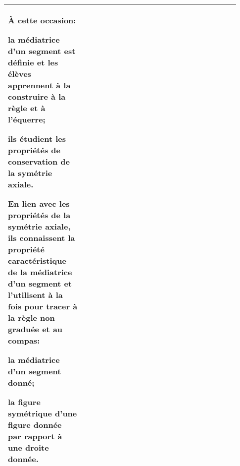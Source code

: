 {\begin{tabular}{|p{0.31\linewidth}|p{0.31\linewidth}|p{0.31\linewidth}|}
À cette occasion:
\begin{mylist}
\item la médiatrice d’un segment est définie et les élèves apprennent à la construire à la règle et à l’équerre;
\item ils étudient les propriétés de conservation de la symétrie axiale.
\end{mylist}
En lien avec les propriétés de la symétrie axiale, ils connaissent la propriété caractéristique de la médiatrice d’un segment et l’utilisent à la fois pour tracer à la règle non graduée et au compas:
\begin{mylist}
\item la médiatrice d’un segment donné;
\item la figure symétrique d’une figure donnée par rapport à une droite donnée.
\end{mylist}
\\\hline
\end{tabular}
\renewcommand{\arraystretch}{1}
}